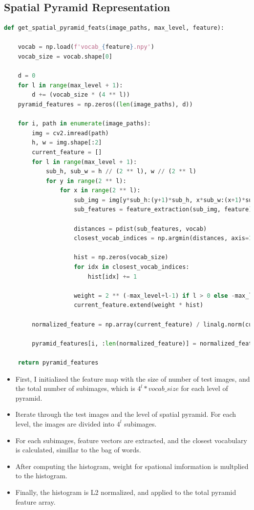 \subsection*{Spatial Pyramid Representation}
\begin{lstlisting}[language=python]
def get_spatial_pyramid_feats(image_paths, max_level, feature):

    vocab = np.load(f'vocab_{feature}.npy')
    vocab_size = vocab.shape[0]

    d = 0
    for l in range(max_level + 1):
        d += (vocab_size * (4 ** l))
    pyramid_features = np.zeros((len(image_paths), d))

    for i, path in enumerate(image_paths):
        img = cv2.imread(path)
        h, w = img.shape[:2]
        current_feature = []
        for l in range(max_level + 1):
            sub_h, sub_w = h // (2 ** l), w // (2 ** l)
            for y in range(2 ** l):
                for x in range(2 ** l):
                    sub_img = img[y*sub_h:(y+1)*sub_h, x*sub_w:(x+1)*sub_w]
                    sub_features = feature_extraction(sub_img, feature)

                    distances = pdist(sub_features, vocab)
                    closest_vocab_indices = np.argmin(distances, axis=1)

                    hist = np.zeros(vocab_size)
                    for idx in closest_vocab_indices:
                        hist[idx] += 1

                    weight = 2 ** (-max_level+l-1) if l > 0 else -max_level
                    current_feature.extend(weight * hist)

        normalized_feature = np.array(current_feature) / linalg.norm(current_feature)

        pyramid_features[i, :len(normalized_feature)] = normalized_feature

    return pyramid_features    
\end{lstlisting}
\begin{itemize}
    \item First, I initialized the feature map with the size of number of test images, and the total number of subimages, which is $4^l*vocab\_size$ for each level of pyramid.
    \item Iterate through the test images and the level of spatial pyramid. For each level, the images are divided into $4^l$ subimages.
    \item For each subimages, feature vectors are extracted, and the closest vocabulary is calculated, simillar to the bag of words. 
    \item After computing the histogram, weight for spational imformation is multplied to the histogram.
    \item Finally, the histogram is L2 normalized, and applied to the total pyramid feature array.
\end{itemize}
